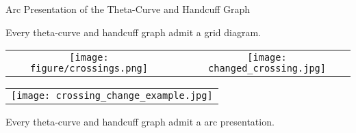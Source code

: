\begin{frame}{Arc Presentation of the Theta-Curve and Handcuff Graph}
	\begin{thm}
    Every theta-curve and handcuff graph admit a grid diagram.
    \end{thm}
	\mypf
    \begin{center}
    \begin{tabu}{c c c}
        \texttt{[image: figure/crossings.png]} &
        \raisebox{0.5cm}{$\xmapsto{}$} &
        \texttt{[image: changed\_crossing.jpg]}
    \end{tabu}
    \begin{tabu}{c}
        \texttt{[image: crossing\_change\_example.jpg]}
    \end{tabu}
    \end{center}
    \begin{corollary}
    Every theta-curve and handcuff graph admit a arc presentation.
    \end{corollary}
\end{frame}
